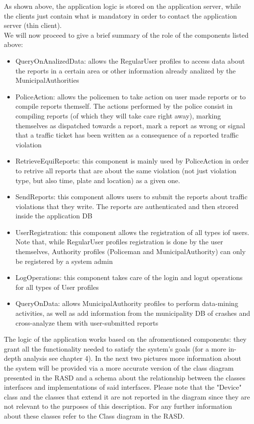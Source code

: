 As shown above, the application logic is stored on the application server, while the clients just contain what is mandatory in order to contact the application server (thin client).\\
We will now proceed to give a brief summary of the role of the components listed above:
\begin{itemize}
\item QueryOnAnalizedData: allows the RegularUser profiles to access data about the reports in a certain area or other information already analized by the MunicipalAuthorities
\item PoliceAction: allows the policemen to take action on user made reports or to compile reports themself. The actions performed by the police consist in compiling reports (of which they will take care right away), marking themselves as dispatched towards a report, mark a report as wrong or signal that a traffic ticket has been written as a consequence of a reported traffic violation
\item RetrieveEquiReports: this component is mainly used by PoliceAction in order to retrive all reports that are about the same violation (not just violation type, but also time, plate and location) as a given one. 
\item SendReports: this component allows users to submit the reports about traffic violations that they write. The reports are authenticated and then strored inside the application DB
\item UserRegistration: this component allows the registration of all types iof users. Note that, while RegularUser profiles registration is done by the user themselves, Authority profiles (Policeman and MunicipalAuthority) can only be registered by a system admin
\item LogOperations: this component takes care of the login and logut operations for all types of User profiles
\item QueryOnData: allows MunicipalAuthority profiles to perform data-mining activities,  as well as add information from the municipality DB of crashes and cross-analyze them with user-submitted reports
\end{itemize}
The logic of the application works based on the afromentioned components: they grant all the functionality needed to satisfy the system's goals (for a more in-depth analysis see chapter 4).
In the next two pictures more information about the system will be provided via a more accurate version of the class diagram presented in the RASD and a schema about the relationship between the classes interfaces and implementations of said interfaces. Please note that the "Device" class and the classes that extend it are not reported in the diagram since they are not relevant to the purposes of this description. For any further information about these classes refer to the Class diagram in the RASD.

